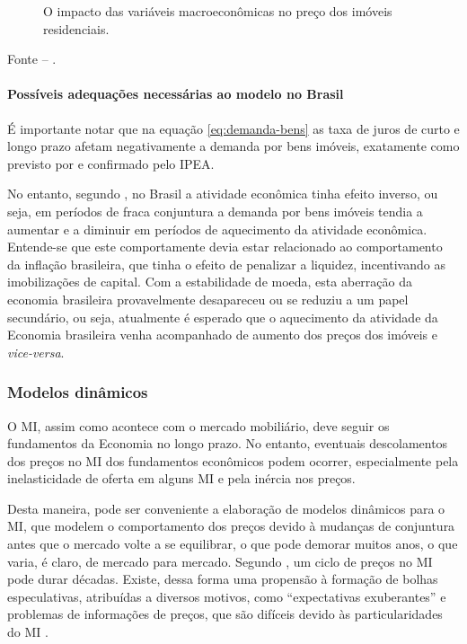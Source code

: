 \documentclass[
	12pt,				%
	oneside,			%
	a4paper,			%
	chapter=TITLE,		%
	section=TITLE,		%
	english,			%
	brazil				%
	]{abntex2}
\newcommand{\bcenter}{\begin{center}}
\newcommand{\ecenter}{\end{center}}
\begin{document}
\begin{refsection}
\begin{figure}[H]
{}

\caption{O impacto das variáveis macroeconômicas no preço dos imóveis residenciais.}\label{fig:adams}
\end{figure}
\bcenter

\small Fonte -- \textcite[p.~6]{ADAMS2010}.
\ecenter

\hypertarget{possuxedveis-adequauxe7uxf5es-necessuxe1rias-ao-modelo-no-brasil}{%
\paragraph{Possíveis adequações necessárias ao modelo no Brasil}\label{possuxedveis-adequauxe7uxf5es-necessuxe1rias-ao-modelo-no-brasil}}

É importante notar que na equação \eqref{eq:demanda-bens} as taxa de juros de
curto e longo prazo afetam negativamente a demanda por bens imóveis, exatamente
como previsto por \textcite{rangel1986b} e confirmado pelo IPEA.

No entanto, segundo \textcite{rangel1986b}, no Brasil a atividade econômica tinha efeito
inverso, ou seja, em períodos de fraca conjuntura a demanda por bens imóveis
tendia a aumentar e a diminuir em períodos de aquecimento da atividade
econômica. Entende-se que este comportamente devia estar relacionado ao
comportamento da inflação brasileira, que tinha o efeito de penalizar a
liquidez, incentivando as imobilizações de capital. Com a estabilidade de moeda,
esta aberração da economia brasileira provavelmente desapareceu ou se reduziu
a um papel secundário, ou seja, atualmente é esperado que o aquecimento da
atividade da Economia brasileira venha acompanhado de aumento dos preços dos
imóveis e \emph{vice-versa}.

\hypertarget{modelos-dinuxe2micos}{%
\subsubsection{Modelos dinâmicos}\label{modelos-dinuxe2micos}}

O \gls{MI}, assim como acontece com o mercado mobiliário, deve
seguir os fundamentos da Economia no longo prazo. No entanto, eventuais
descolamentos dos preços no \gls{MI} dos fundamentos econômicos podem
ocorrer, especialmente pela inelasticidade de oferta em alguns \gls{MI} e pela
inércia nos preços.

Desta maneira, pode ser conveniente a elaboração de modelos dinâmicos para o
\gls{MI}, que modelem o comportamento dos preços devido à mudanças de conjuntura
antes que o mercado volte a se equilibrar, o que pode demorar muitos anos, o que
varia, é claro, de mercado para mercado. Segundo \textcite[p.~4]{regulation}, um ciclo de
preços no \gls{MI} pode durar décadas. Existe, dessa forma uma
propensão à formação de bolhas especulativas, atribuídas a diversos motivos,
como ``expectativas exuberantes'' e problemas de informações de preços, que são
difíceis devido às particularidades do \gls{MI} \autocite[3]{ADAMS2010}.


\end{refsection}
\end{document}
